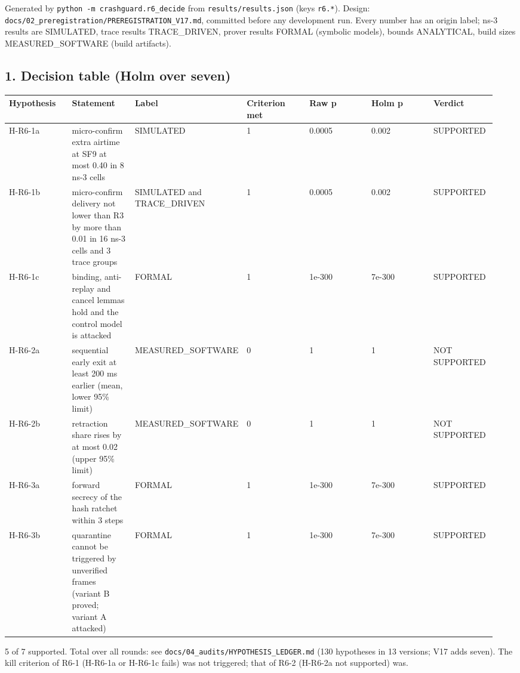 


Generated by \texttt{python -m crashguard.r6\_decide} from \texttt{results/results.json} (keys \texttt{r6.*}). Design: \texttt{docs/02\_preregistration/PREREGISTRATION\_V17.md}, committed before any development run. Every number has an origin label; ns-3 results are SIMULATED, trace results TRACE\_DRIVEN, prover results FORMAL (symbolic models), bounds ANALYTICAL, build sizes MEASURED\_SOFTWARE (build artifacts).

\subsection*{1. Decision table (Holm over seven)}

{\scriptsize\raggedright
\begin{longtable}{p{0.136\linewidth}p{0.136\linewidth}p{0.136\linewidth}p{0.136\linewidth}p{0.136\linewidth}p{0.136\linewidth}p{0.136\linewidth}}
\toprule
Hypothesis & Statement & Label & Criterion met & Raw p & Holm p & Verdict \\
\midrule
\endhead
H-R6-1a & micro-confirm extra airtime at SF9 at most 0.40 in 8 ns-3 cells & SIMULATED & 1 & 0.0005 & 0.002 & SUPPORTED \\
H-R6-1b & micro-confirm delivery not lower than R3 by more than 0.01 in 16 ns-3 cells and 3 trace groups & SIMULATED and TRACE\_DRIVEN & 1 & 0.0005 & 0.002 & SUPPORTED \\
H-R6-1c & binding, anti-replay and cancel lemmas hold and the control model is attacked & FORMAL & 1 & 1e-300 & 7e-300 & SUPPORTED \\
H-R6-2a & sequential early exit at least 200 ms earlier (mean, lower 95\% limit) & MEASURED\_SOFTWARE & 0 & 1 & 1 & NOT SUPPORTED \\
H-R6-2b & retraction share rises by at most 0.02 (upper 95\% limit) & MEASURED\_SOFTWARE & 0 & 1 & 1 & NOT SUPPORTED \\
H-R6-3a & forward secrecy of the hash ratchet within 3 steps & FORMAL & 1 & 1e-300 & 7e-300 & SUPPORTED \\
H-R6-3b & quarantine cannot be triggered by unverified frames (variant B proved; variant A attacked) & FORMAL & 1 & 1e-300 & 7e-300 & SUPPORTED \\
\bottomrule
\end{longtable}}

5 of 7 supported. Total over all rounds: see \texttt{docs/04\_audits/HYPOTHESIS\_LEDGER.md} (130 hypotheses in 13 versions; V17 adds seven). The kill criterion of R6-1 (H-R6-1a or H-R6-1c fails) was not triggered; that of R6-2 (H-R6-2a not supported) was.

